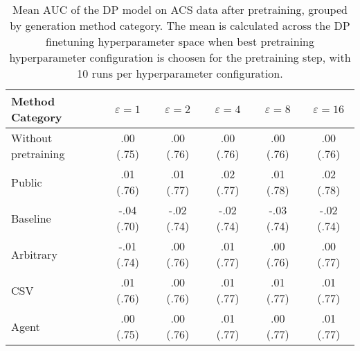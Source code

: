 \begin{table}[h!]
    \centering
    \caption{Mean AUC of the DP model on ACS data after pretraining, grouped by generation method category. The mean is calculated across the DP finetuning hyperparameter space when best pretraining hyperparameter configuration is choosen for the pretraining step, with 10 runs per hyperparameter configuration.}
    \label{tab:epsilon_comparison}
    \begin{tabular}{lccccc}
    \toprule
    Method Category & $\varepsilon=1$ & $\varepsilon=2$ & $\varepsilon=4$ & $\varepsilon=8$ & $\varepsilon=16$ \\
    \midrule
    Without pretraining & .00 {\small (.75)} & .00 {\small (.76)} & .00 {\small (.76)} & .00 {\small (.76)} & .00 {\small (.76)} \\
    \arrayrulecolor{black!50!}\midrule
    Public & \cellcolor{gold!30}.01 {\small (.76)} & \cellcolor{gold!30}.01 {\small (.77)} & \cellcolor{gold!30}.02 {\small (.77)} & \cellcolor{gold!30}.01 {\small (.78)} & \cellcolor{gold!30}.02 {\small (.78)} \\
    \arrayrulecolor{black!50!}\midrule
    Baseline & -.04 {\small (.70)} & -.02 {\small (.74)} & -.02 {\small (.74)} & -.03 {\small (.74)} & -.02 {\small (.74)} \\
    \arrayrulecolor{black!50!}\midrule
    Arbitrary & -.01 {\small (.74)} & \cellcolor{bronze!30}.00 {\small (.76)} & \cellcolor{bronze!30}.01 {\small (.77)} & .00 {\small (.76)} & .00 {\small (.77)} \\
    \arrayrulecolor{black!50!}\midrule
    CSV & \cellcolor{silver!30}.01 {\small (.76)} & \cellcolor{silver!30}.00 {\small (.76)} & \cellcolor{silver!30}.01 {\small (.77)} & \cellcolor{silver!30}.01 {\small (.77)} & \cellcolor{silver!30}.01 {\small (.77)} \\
    Agent & \cellcolor{bronze!30}.00 {\small (.75)} & \cellcolor{bronze!30}.00 {\small (.76)} & \cellcolor{bronze!30}.01 {\small (.77)} & \cellcolor{bronze!30}.00 {\small (.77)} & \cellcolor{bronze!30}.01 {\small (.77)} \\
    \bottomrule
    \end{tabular}
\end{table}